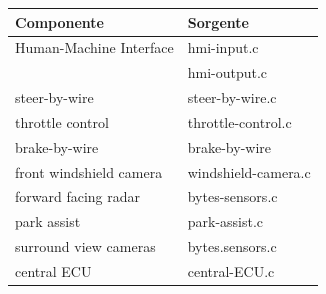 \documentclass[11pt, openany]{article}
\theoremstyle{definition}
\theoremstyle{plain}
\theoremstyle{remark}
\begin{document}
			\begin{tcolorbox}[width=\textwidth,colback={Cornsilk2}]\label{tab:sorgenti}
				\begin{tabularx}{\textwidth}{p{8cm}  l}
					\textbf{Componente}			&	\textbf{Sorgente}	\\\toprule
					Human-Machine Interface 	& 	hmi-input.c			\\
												&	hmi-output.c		\\\midrule
					steer-by-wire				&	steer-by-wire.c		\\\midrule
					throttle control			&	throttle-control.c	\\\midrule
					brake-by-wire				&	brake-by-wire		\\\midrule
					front windshield camera		&	windshield-camera.c	\\\midrule
					forward facing radar		&	bytes-sensors.c		\\\midrule
					park assist					&	park-assist.c		\\\midrule
					surround view cameras		&	bytes.sensors.c		\\\midrule
					central ECU					&	central-ECU.c


				\end{tabularx}
			\end{tcolorbox}
\end{document}
